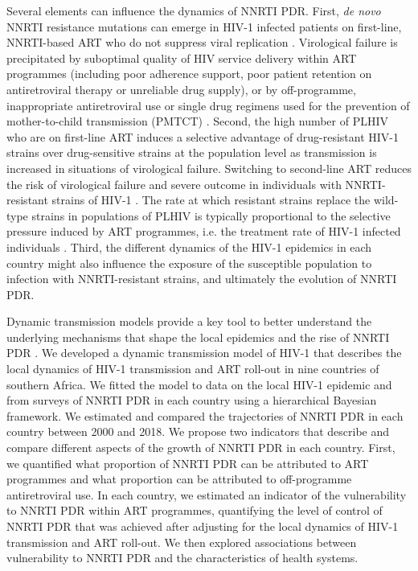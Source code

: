 \documentclass{article}
\begin{document}
Several elements can influence the dynamics of NNRTI PDR. 
First, {\em de novo} NNRTI resistance mutations can emerge in HIV-1 infected patients on first-line, NNRTI-based ART who do not suppress viral replication \cite{clavel2004hiv,kepler1998drug,zur2011population}.
Virological failure is precipitated by suboptimal quality of HIV service delivery within ART programmes (including poor adherence support, poor patient retention on antiretroviral therapy or unreliable drug supply), or by off-programme, inappropriate antiretroviral use or single drug regimens used for the prevention of mother-to-child transmission (PMTCT) \cite{hamers2018hiv}.
Second, the high number of PLHIV who are on first-line ART induces a selective advantage of drug-resistant HIV-1 strains over drug-sensitive strains at the population level as transmission is increased in situations of virological failure. 
Switching to second-line ART reduces the risk of virological failure and severe outcome in individuals with NNRTI-resistant strains of HIV-1 \cite{gsponer2012causal,ramadhani2016effect}. 
The rate at which resistant strains replace the wild-type strains in populations of PLHIV is typically proportional to the selective pressure induced by ART programmes, i.e. the treatment rate of HIV-1 infected individuals \cite{bonhoeffer1997virus,fingerhuth2016antibiotic}.
Third, the different dynamics of the HIV-1 epidemics in each country might also influence the exposure of the susceptible population to infection with NNRTI-resistant strains, and ultimately the evolution of NNRTI PDR. 

Dynamic transmission models provide a key tool to better understand the underlying mechanisms that shape the local epidemics and the rise of NNRTI PDR \cite{hauser2019bridging}.
We developed a dynamic transmission model of HIV-1 that describes the local dynamics of HIV-1 transmission and ART roll-out in nine countries of southern Africa. 
We fitted the model to data on the local HIV-1 epidemic and from surveys of NNRTI PDR in each country using a hierarchical Bayesian framework. 
We estimated and compared the trajectories of NNRTI PDR in each country between 2000 and 2018. 
We propose two indicators that describe and compare different aspects of the growth of NNRTI PDR in each country. 
First, we quantified what proportion of NNRTI PDR can be attributed to ART programmes and what proportion can be attributed to off-programme antiretroviral use. 
In each country, we estimated  an indicator of the vulnerability to NNRTI PDR within ART programmes, quantifying the level of control of NNRTI PDR that was achieved after adjusting for the local dynamics of HIV-1 transmission and ART roll-out. 
We then explored associations between  vulnerability to NNRTI PDR and the characteristics of health systems. 
\end{document}
